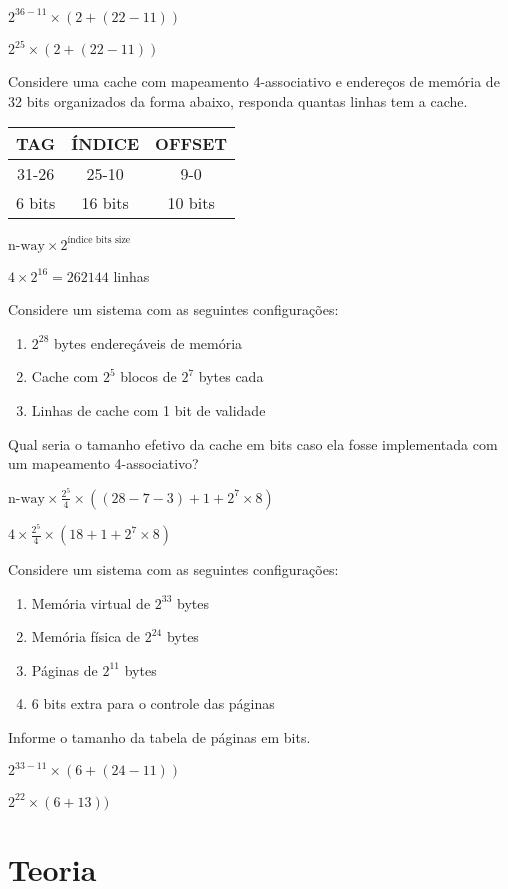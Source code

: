 \documentclass{article}
\begin{document}
$2^{36-11}\times(2+(22-11))$

$2^{25}\times(2+(22-11))$

Considere uma cache com mapeamento 4-associativo e endereços de memória de 32
bits organizados da forma abaixo, responda quantas linhas tem a cache.

\begin{tabular}{|c|c|c|}
\hline TAG & ÍNDICE & OFFSET \\
\hline 31-26 & 25-10 & 9-0 \\
\hline 6 bits & 16 bits & 10 bits \\
\hline
\end{tabular}

$\text{n-way} \times 2^{\text{índice bits size}}$

$4 \times 2^{16} = 262144$ linhas

Considere um sistema com as seguintes configurações:

\begin{enumerate}
\item $2^{28}$ bytes endereçáveis de memória
\item Cache com $2^{5}$ blocos de $2^{7}$ bytes cada
\item Linhas de cache com 1 bit de validade
\end{enumerate}

Qual seria o tamanho efetivo da cache em bits caso ela fosse implementada com
um mapeamento 4-associativo?

$\text{n-way} \times \frac{2^{5}}{4} \times((28-7-3)+1+2^{7}\times8)$

$4 \times \frac{2^{5}}{4}\times(18+1+2^{7}\times8)$

\pagebreak
Considere um sistema com as seguintes configurações:

\begin{enumerate}
\item Memória virtual de $2^{33}$ bytes
\item Memória física de $2^{24}$ bytes
\item Páginas de $2^{11}$ bytes
\item 6 bits extra para o controle das páginas
\end{enumerate}

Informe o tamanho da tabela de páginas em bits.

$2^{33-11}\times(6+(24-11))$

$2^{22}\times(6+13))$

\section{Teoria}
\end{document}
